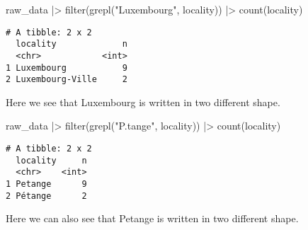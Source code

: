 \documentclass[
  letterpaper,
  DIV=11,
  numbers=noendperiod]{scrartcl}
\newenvironment{Shaded}{\begin{snugshade}}{\end{snugshade}}
\newcommand{\FunctionTok}[1]{\textcolor[rgb]{0.28,0.35,0.67}{#1}}
\newcommand{\NormalTok}[1]{\textcolor[rgb]{0.00,0.23,0.31}{#1}}
\newcommand{\SpecialCharTok}[1]{\textcolor[rgb]{0.37,0.37,0.37}{#1}}
\newcommand{\StringTok}[1]{\textcolor[rgb]{0.13,0.47,0.30}{#1}}
\begin{document}
\begin{Shaded}
\begin{Highlighting}[]
\NormalTok{raw\_data }\SpecialCharTok{|\textgreater{}} 
  \FunctionTok{filter}\NormalTok{(}\FunctionTok{grepl}\NormalTok{(}\StringTok{"Luxembourg"}\NormalTok{, locality)) }\SpecialCharTok{|\textgreater{}}
  \FunctionTok{count}\NormalTok{(locality)}
\end{Highlighting}
\end{Shaded}

\begin{verbatim}
# A tibble: 2 x 2
  locality             n
  <chr>            <int>
1 Luxembourg           9
2 Luxembourg-Ville     2
\end{verbatim}

Here we see that Luxembourg is written in two different shape.

\begin{Shaded}
\begin{Highlighting}[]
\NormalTok{raw\_data }\SpecialCharTok{|\textgreater{}}
  \FunctionTok{filter}\NormalTok{(}\FunctionTok{grepl}\NormalTok{(}\StringTok{"P.tange"}\NormalTok{, locality)) }\SpecialCharTok{|\textgreater{}}
  \FunctionTok{count}\NormalTok{(locality)}
\end{Highlighting}
\end{Shaded}

\begin{verbatim}
# A tibble: 2 x 2
  locality     n
  <chr>    <int>
1 Petange      9
2 Pétange      2
\end{verbatim}

Here we can also see that Petange is written in two different shape.
\end{document}
